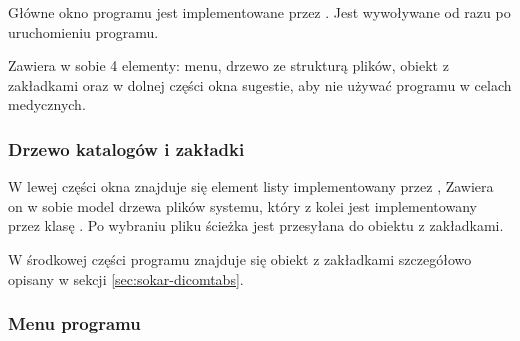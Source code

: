\label{sec:sokar-window}

\par
Główne okno programu jest implementowane przez .
Jest wywoływane od razu po uruchomieniu programu.
\par
Zawiera w sobie 4 elementy: menu, drzewo ze strukturą plików, obiekt z zakładkami oraz w dolnej części okna sugestie, aby nie używać programu w celach medycznych.

\subsubsection{Drzewo katalogów i zakładki}

\par
W lewej części okna znajduje się element listy implementowany przez ,
Zawiera on w sobie model drzewa plików systemu, który z kolei jest implementowany przez klasę .
Po wybraniu pliku ścieżka jest przesyłana do obiektu z zakładkami.
\par
W środkowej części programu znajduje się obiekt z zakładkami szczegółowo opisany w sekcji \ref{sec:sokar-dicomtabs}.

\subsubsection{Menu programu}
\label{sec:sokar-window-menu}

